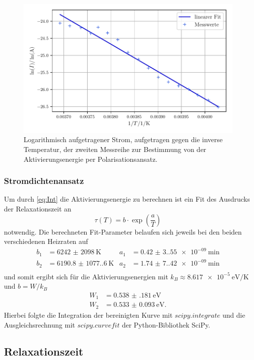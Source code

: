 \begin{figure}
    \centering
    \includegraphics[width=0.7\linewidth]{scripts/build/plot2_1.pdf}
    \caption{Logarithmisch aufgetragener Strom, aufgetragen gegen die inverse Temperatur, der zweiten Messreihe zur Bestimmung von der Aktivierungsenergie per Polarisationsansatz.}
    \label{fig:W1_2}
\end{figure}
\newpage
\subsubsection{Stromdichtenansatz}
Um durch \autoref{eq:Int} die Aktivierungsenergie zu berechnen ist ein Fit des Ausdrucks der Relaxationszeit an
\begin{equation*}
    \tau(T) = b \cdot \exp\left(\frac{a}{T}\right)
\end{equation*}
notwendig.
Die berechneten Fit-Parameter belaufen sich jeweils bei den beiden verschiedenen Heizraten auf
\begin{align}
    b_1 &= \qty{6242(2098)}{\kelvin} & a_1 &= \qty{0.42(3.55)e-09}{\minute} \\
    b_2 &= \qty{6190.8(1077.6)}{\kelvin} & a_2 &= \qty{1.74(7.42)e-09}{\minute} \\
\end{align}
und somit ergibt sich für die Aktivierungsenergien mit $k_B \approx \qty{8,617e-5}{\electronvolt\per\kelvin}$
und $b = W/k_B$ 
\begin{align}
    W_1 &= \qty{0.538(181)}{\electronvolt} \\
    W_2 &= \qty{0.533(93)}{\electronvolt}.
\end{align}
Hierbei folgte die Integration der bereinigten Kurve mit $scipy.integrate$ und die Ausgleichsrechnung mit $scipy.curvefit$
der Python-Bibliothek SciPy\cite{scipy}.

\subsection{Relaxationszeit}

